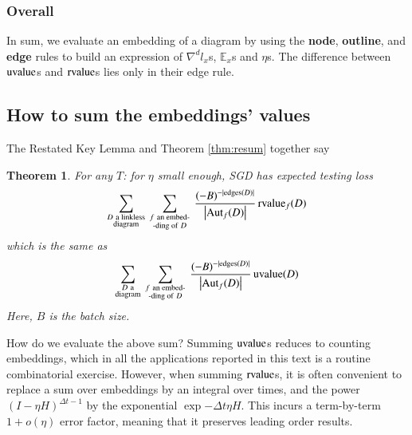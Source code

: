 \documentclass[anon,12pt]{colt2021} %
\newtheorem*{thm*}{Theorem}
\newcommand{\wrap}[1]{\left(#1\right)}
\newcommand{\wabs}[1]{\left|#1\right|}
\newcommand{\Aut}{\text{\textnormal{Aut}}}
\newcommand{\uvalue}{\text{\textnormal{uvalue}}}
\newcommand{\rvalue}{\text{\textnormal{rvalue}}}
\newcommand{\edges}{\text{\textnormal{edges}}}
\newcommand{\expc}{\mathbb{E}}
\begin{document}
        \subsubsection{Overall}
            In sum, we evaluate an embedding of a diagram by using the 
            \textbf{node}, 
            \textbf{outline}, and
            \textbf{edge}
            rules to build an expression of $\nabla^d l_x$s, $\expc_x$s and
            $\eta$s.  The difference between $\uvalue$s and $\rvalue$s lies
            only in their edge rule.

    \subsection{How to sum the embeddings' values}                  \label{appendix:sum-embeddings}
        The Restated Key Lemma and Theorem \ref{thm:resum} together say %
        \begin{thm*}
            For any $T$: for $\eta$ small enough, SGD has expected testing loss
            \begin{equation*}
                \sum_{\substack{D~\text{a linkless} \\ \text{diagram}}}
                ~
                \sum_{\substack{f~\text{an embed-} \\ \text{-ding of}~D}}
                ~
                \frac{(-B)^{-|\edges(D)|}}{\wabs{\Aut_f(D)}}
                \,
                {\rvalue_f}(D)
            \end{equation*}
            which is the same as
            \begin{equation*}
                \sum_{\substack{D~\text{a} \\ \text{diagram}}}
                ~
                \sum_{\substack{f~\text{an embed-} \\ \text{-ding of}~D}}
                ~
                \frac{(-B)^{-|\edges(D)|}}{\wabs{\Aut_f(D)}}
                \,
                {\uvalue}(D)
            \end{equation*}
            Here, $B$ is the batch size.
        \end{thm*}

        How do we evaluate the above sum?
        Summing $\uvalue$s reduces to counting embeddings, which in all the
        applications reported in this text is a routine combinatorial exercise. 
        However, when summing $\rvalue$s, it is often convenient to replace
        a sum over embeddings by an integral over times, and
        the power $\wrap{I-\eta H}^{\Delta t-1}$ by
        the exponential $\exp{-\Delta t \eta H}$.  This incurs a term-by-term
        $1+o(\eta)$ error factor, meaning that it preserves leading order
        results. 
\end{document}
